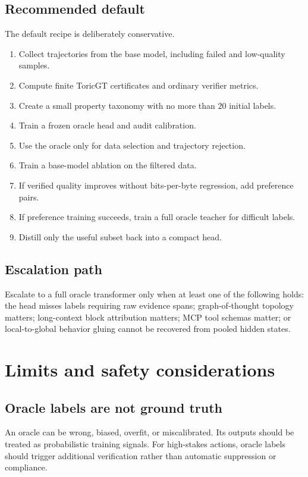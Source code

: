 \documentclass[11pt]{article}
\numberwithin{equation}{section}
\begin{document}
\subsection{Recommended default}
The default recipe is deliberately conservative.
\begin{enumerate}
\item Collect trajectories from the base model, including failed and low-quality samples.
\item Compute finite ToricGT certificates and ordinary verifier metrics.
\item Create a small property taxonomy with no more than $20$ initial labels.
\item Train a frozen oracle head and audit calibration.
\item Use the oracle only for data selection and trajectory rejection.
\item Train a base-model ablation on the filtered data.
\item If verified quality improves without bits-per-byte regression, add preference pairs.
\item If preference training succeeds, train a full oracle teacher for difficult labels.
\item Distill only the useful subset back into a compact head.
\end{enumerate}

\subsection{Escalation path}
Escalate to a full oracle transformer only when at least one of the following holds: the head misses labels requiring raw evidence spans; graph-of-thought topology matters; long-context block attribution matters; MCP tool schemas matter; or local-to-global behavior gluing cannot be recovered from pooled hidden states.

\section{Limits and safety considerations}
\subsection{Oracle labels are not ground truth}
An oracle can be wrong, biased, overfit, or miscalibrated. Its outputs should be treated as probabilistic training signals. For high-stakes actions, oracle labels should trigger additional verification rather than automatic suppression or compliance.
\end{document}
